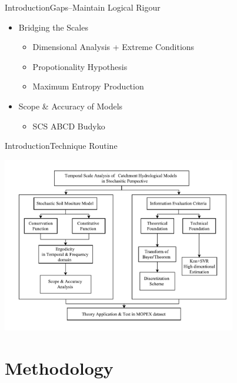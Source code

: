 \documentclass[10pt]{beamer}
\begin{document}
\begin{frame}{Introduction}{Gaps--Maintain Logical Rigour} 
\begin{itemize}
\item Bridging the Scales
\begin{itemize}
\item Dimensional Analysis + Extreme Conditions 
\item Propotionality Hypothesis 
\item Maximum Entropy Production 
\end{itemize}
\item Scope \& Accuracy of Models
\begin{itemize}
\item SCS \rightarrow ABCD \rightarrow Budyko
 
\end{itemize}
 
\end{itemize} 
\end{frame}
 
\begin{frame}{Introduction}{Technique Routine} 
 
  \includegraphics[width=10.245cm]{flowchart.pdf} 
 
\end{frame}



\section{Methodology}
\end{document}
